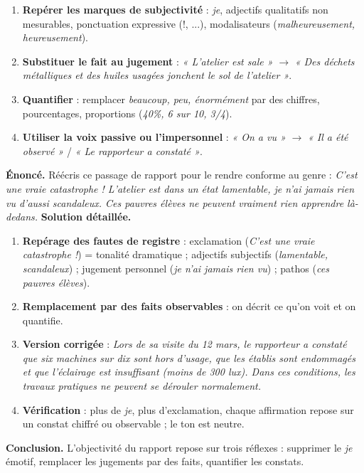 \documentclass[11pt]{article}
\begin{document}
\begin{methode}
\begin{enumerate}
\item \textbf{Repérer les marques de subjectivité} : \emph{je}, adjectifs qualitatifs non mesurables, ponctuation expressive (!, ...), modalisateurs (\emph{malheureusement, heureusement}).
\item \textbf{Substituer le fait au jugement} : \emph{« L'atelier est sale »} $\rightarrow$ \emph{« Des déchets métalliques et des huiles usagées jonchent le sol de l'atelier »}.
\item \textbf{Quantifier} : remplacer \emph{beaucoup, peu, énormément} par des chiffres, pourcentages, proportions (\emph{40\%, 6 sur 10, 3/4}).
\item \textbf{Utiliser la voix passive ou l'impersonnel} : \emph{« On a vu »} $\rightarrow$ \emph{« Il a été observé »} / \emph{« Le rapporteur a constaté »}.
\end{enumerate}
\end{methode}

\begin{exoresolu}
\textbf{Énoncé.} Réécris ce passage de rapport pour le rendre conforme au genre : \emph{C'est une vraie catastrophe ! L'atelier est dans un état lamentable, je n'ai jamais rien vu d'aussi scandaleux. Ces pauvres élèves ne peuvent vraiment rien apprendre là-dedans.}
\tcblower
\textbf{Solution détaillée.}
\begin{enumerate}
\item \textbf{Repérage des fautes de registre} : exclamation (\emph{C'est une vraie catastrophe !}) = tonalité dramatique ; adjectifs subjectifs (\emph{lamentable, scandaleux}) ; jugement personnel (\emph{je n'ai jamais rien vu}) ; pathos (\emph{ces pauvres élèves}).
\item \textbf{Remplacement par des faits observables} : on décrit ce qu'on voit et on quantifie.
\item \textbf{Version corrigée} : \emph{Lors de sa visite du 12 mars, le rapporteur a constaté que six machines sur dix sont hors d'usage, que les établis sont endommagés et que l'éclairage est insuffisant (moins de 300 lux). Dans ces conditions, les travaux pratiques ne peuvent se dérouler normalement.}
\item \textbf{Vérification} : plus de \emph{je}, plus d'exclamation, chaque affirmation repose sur un constat chiffré ou observable ; le ton est neutre.
\end{enumerate}
\textbf{Conclusion.} L'objectivité du rapport repose sur trois réflexes : supprimer le \emph{je} émotif, remplacer les jugements par des faits, quantifier les constats.
\end{exoresolu}
\end{document}
